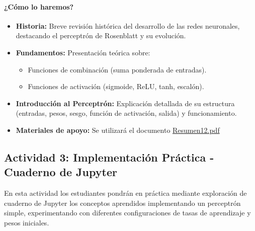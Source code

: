 \documentclass[a4,11pt]{aleph-notas}
\begin{document}
\paragraph{¿Cómo lo haremos?}  
\begin{itemize}[leftmargin=*]
    \item \textbf{Historia:}
    Breve revisión histórica del desarrollo de las redes neuronales, destacando el perceptrón de Rosenblatt y su evolución.
    
    \item \textbf{Fundamentos:}
    Presentación teórica sobre:
    \begin{itemize}
        \item Funciones de combinación (suma ponderada de entradas).
        \item Funciones de activación (sigmoide, ReLU, tanh, escalón).
    \end{itemize}
    
    \item \textbf{Introducción al Perceptrón:}
    Explicación detallada de su estructura (entradas, pesos, sesgo, función de activación, salida) y funcionamiento.
    
        \item \textbf{Materiales de apoyo:} 
    Se utilizará el documento \href{https://andres-merino.github.io/AprendizajeAutomaticoInicial-05-N0105/2-Resumenes/Resumen12.pdf}{Resumen12.pdf}
    
\end{itemize}

\subsection*{Actividad 3: Implementación Práctica - Cuaderno de Jupyter}

En esta actividad los estudiantes pondrán en práctica mediante exploración de cuaderno de Jupyter los conceptos aprendidos implementando un perceptrón simple, experimentando con diferentes configuraciones de tasas de aprendizaje y pesos iniciales.
\end{document}
